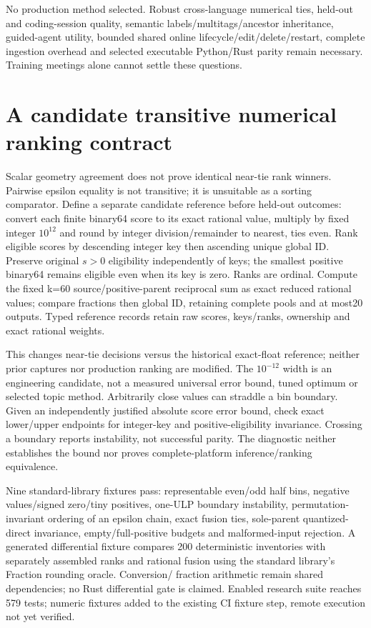 \documentclass[11pt]{article}
\begin{document}
No production method selected. Robust cross-language numerical ties, held-out
and coding-session quality, semantic labels/multitags/ancestor inheritance,
guided-agent utility, bounded shared online lifecycle/edit/delete/restart,
complete ingestion overhead and selected executable Python/Rust parity remain
necessary. Training meetings alone cannot settle these questions.

\section{A candidate transitive numerical ranking contract}
Scalar geometry agreement does not prove identical near-tie rank winners.
Pairwise epsilon equality is not transitive; it is unsuitable as a sorting
comparator. Define a separate candidate reference before held-out outcomes:
convert each finite binary64 score to its exact rational value, multiply by
fixed integer $10^{12}$ and round by integer division/remainder to nearest,
ties even. Rank eligible scores by descending integer key then ascending
unique global ID. Preserve original $s>0$ eligibility independently of keys;
the smallest positive binary64 remains eligible even when its key is zero.
Ranks are ordinal. Compute the fixed k=60 source/positive-parent reciprocal
sum as exact reduced rational values; compare fractions then global ID,
retaining complete pools and at most20 outputs. Typed reference records retain
raw scores, keys/ranks, ownership and exact rational weights.

This changes near-tie decisions versus the historical exact-float reference;
neither prior captures nor production ranking are modified. The $10^{-12}$
width is an engineering candidate, not a measured universal error bound,
tuned optimum or selected topic method. Arbitrarily close values can straddle
a bin boundary. Given an independently justified absolute score error bound,
check exact lower/upper endpoints for integer-key and positive-eligibility
invariance. Crossing a boundary reports instability, not successful parity.
The diagnostic neither establishes the bound nor proves complete-platform
inference/ranking equivalence.

Nine standard-library fixtures pass: representable even/odd half bins,
negative values/signed zero/tiny positives, one-ULP boundary instability,
permutation-invariant ordering of an epsilon chain, exact fusion ties,
sole-parent quantized-direct invariance, empty/full-positive budgets and
malformed-input rejection. A generated differential fixture compares
200 deterministic inventories with separately assembled ranks and rational
fusion using the standard library's Fraction rounding oracle. Conversion/
fraction arithmetic remain shared dependencies; no Rust differential gate is
claimed. Enabled research suite reaches 579 tests; numeric fixtures added to
the existing CI fixture step, remote execution not yet verified.
\end{document}
